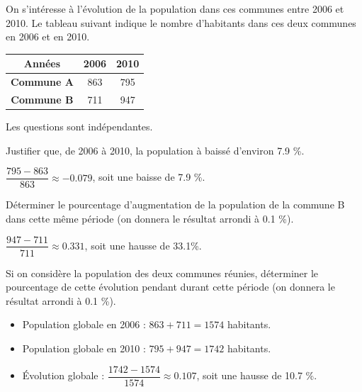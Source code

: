 \documentclass[a4paper,11pt]{exam}
\begin{document}
\begin{multicols}{2}

\vspace*{0.1cm}	
On s'intéresse à l'évolution de la population dans ces communes entre 2006 et 2010. Le tableau suivant indique le nombre d'habitants dans ces deux communes en 2006 et en 2010. 



	\begin{tabular}{|@{\ }c@{\ }|@{\ }c@{\ }|@{\ }c@{\ }|}
		\hline
		\textbf{Années} & \textbf{2006} & \textbf{2010}\\
		\hline
		\textbf{Commune A} & \num{863} & \num{795}  \\
		\hline 
		\textbf{Commune B} & \num{711} & \num{947}  \\
		\hline
	\end{tabular}

\end{multicols}	

Les questions sont indépendantes.

\begin{questions}
	\question Justifier que, de 2006 à 2010, la population à baissé d'environ \num{7.9} \%.
	\begin{solution}
		$\dfrac{795 - 863}{863} \approx \num{-0.079} $, soit une baisse de \num{7.9} \%.
	\end{solution}
	
	\question Déterminer le pourcentage d'augmentation de la population de la commune B dans cette même période (on donnera le résultat arrondi à \num{0.1} \%).
	\begin{solution}
		$\dfrac{947-711}{711}\approx \num{0.331}$, soit une hausse de \num{33.1}\%.
	\end{solution}
	
	\question Si on considère la population des deux communes réunies, déterminer le pourcentage de cette évolution pendant durant cette période (on donnera le résultat arrondi à \num{0.1} \%).
	\begin{solution}
		\begin{itemize}
			\item Population globale en 2006 : $863 + 711 = 1574$ habitants.
			\item Population globale en 2010 : $795 + 947 = 1742$ habitants.
			\item \'Evolution globale : $\dfrac{1742-1574}{1574} \approx \num{0.107}$, soit une hausse de \num{10.7} \%.
		\end{itemize}
	\end{solution}
	
\end{questions}
\end{document}
